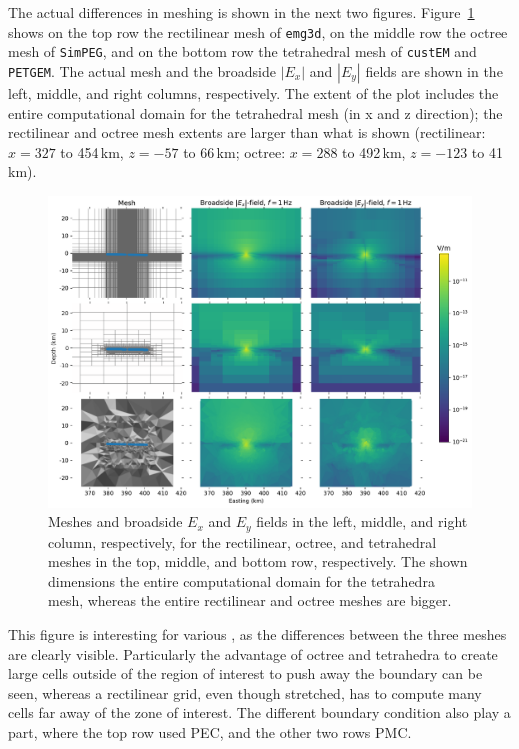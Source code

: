 \documentclass[extra, camera,%
]{gji}
\newcommand{\emg}[2]{\texttt{emg#1#2}\xspace}
\newcommand{\simpeg}{\texttt{SimPEG}\xspace}
\newcommand{\custem}{\texttt{custEM}\xspace}
\newcommand{\petgem}{\texttt{PETGEM}\xspace}
\begin{document}
The actual differences in meshing is shown in the next two figures. Figure~\ref{fig:results-marlim_big} shows on the top row the rectilinear mesh of \emg3d, on the middle row the octree mesh of \simpeg, and on the bottom row the tetrahedral mesh of \custem and \petgem. The actual mesh and the broadside $|E_x|$ and $|E_y|$ fields are shown in the left, middle, and right columns, respectively. The extent of the plot includes the entire computational domain for the tetrahedral mesh (in x and z direction); the rectilinear and octree mesh extents are larger than what is shown (rectilinear: $x=327$ to 454\,km, $z=-57$ to 66\,km; octree: $x=288$ to 492\,km, $z=-123$ to 41\,km).
%
\begin{figure}
  \centering
  \includegraphics[width=.9\linewidth]{figures/results-marlim_big}
  \caption{Meshes and broadside $E_x$ and $E_y$ fields in the left, middle, and right column, respectively, for the rectilinear, octree, and tetrahedral meshes in the top, middle, and bottom row, respectively. The shown dimensions  the entire computational domain for the tetrahedra mesh, whereas the entire rectilinear and octree meshes are bigger.}
  \label{fig:results-marlim_big}
\end{figure}
%
This figure is interesting for various , as the differences between the three meshes are clearly visible. Particularly the advantage of octree and tetrahedra to create large cells outside of the region of interest to push away the boundary can be seen, whereas a rectilinear grid, even though stretched, has to compute many cells far away of the zone of interest. The different boundary condition also play a part, where the top row used PEC, and the other two rows PMC.
\end{document}
